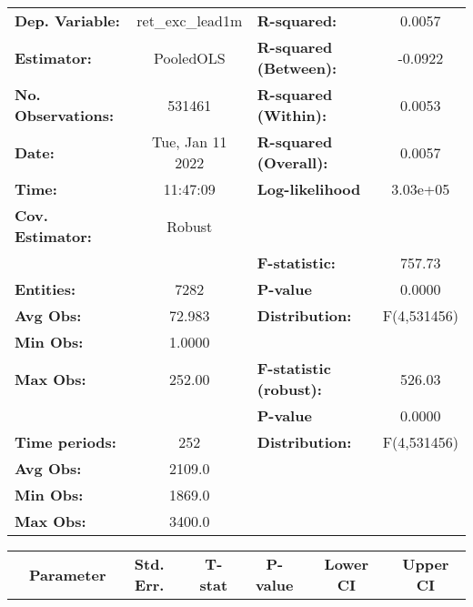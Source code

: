 \begin{center}
\begin{tabular}{lclc}
\toprule
\textbf{Dep. Variable:}    &  ret\_exc\_lead1m  & \textbf{  R-squared:         }   &      0.0057      \\
\textbf{Estimator:}        &     PooledOLS      & \textbf{  R-squared (Between):}  &     -0.0922      \\
\textbf{No. Observations:} &       531461       & \textbf{  R-squared (Within):}   &      0.0053      \\
\textbf{Date:}             &  Tue, Jan 11 2022  & \textbf{  R-squared (Overall):}  &      0.0057      \\
\textbf{Time:}             &      11:47:09      & \textbf{  Log-likelihood     }   &     3.03e+05     \\
\textbf{Cov. Estimator:}   &       Robust       & \textbf{                     }   &                  \\
\textbf{}                  &                    & \textbf{  F-statistic:       }   &      757.73      \\
\textbf{Entities:}         &        7282        & \textbf{  P-value            }   &      0.0000      \\
\textbf{Avg Obs:}          &       72.983       & \textbf{  Distribution:      }   &   F(4,531456)    \\
\textbf{Min Obs:}          &       1.0000       & \textbf{                     }   &                  \\
\textbf{Max Obs:}          &       252.00       & \textbf{  F-statistic (robust):} &      526.03      \\
\textbf{}                  &                    & \textbf{  P-value            }   &      0.0000      \\
\textbf{Time periods:}     &        252         & \textbf{  Distribution:      }   &   F(4,531456)    \\
\textbf{Avg Obs:}          &       2109.0       & \textbf{                     }   &                  \\
\textbf{Min Obs:}          &       1869.0       & \textbf{                     }   &                  \\
\textbf{Max Obs:}          &       3400.0       & \textbf{                     }   &                  \\
\bottomrule
\end{tabular}
\begin{tabular}{lcccccc}
                & \textbf{Parameter} & \textbf{Std. Err.} & \textbf{T-stat} & \textbf{P-value} & \textbf{Lower CI} & \textbf{Upper CI}  \\

\end{tabular}
\end{center}
